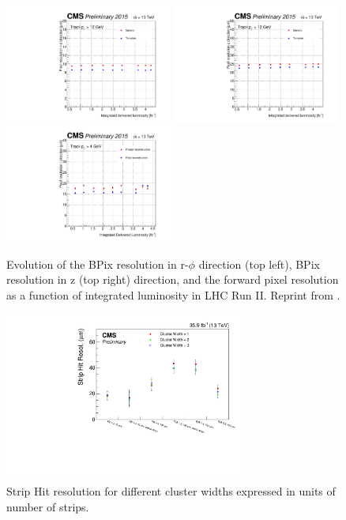\documentclass[thesis.tex]{subfiles}
\begin{document}
\begin{figure}[!htb]
	\centering
	\includegraphics[width=0.49\textwidth]{Fig/LumiPlot_x_GenericVsTemplate_ReReco_3.pdf}
	\includegraphics[width=0.49\textwidth]{Fig/LumiPlot_y_GenericVsTemplate_ReReco_3.pdf} \\
	\includegraphics[width=0.49\textwidth]{Fig/LuminosityHistoryPlot_all_template.pdf}
	\caption{Evolution of the BPix resolution in r-$\phi$ direction (top left), BPix resolution in z (top right) direction, and the forward pixel resolution as a function of integrated luminosity in LHC Run II. Reprint from \cite{PixelPerformance}.}
	\label{fig:pixelreso}
\end{figure}

\begin{figure}[!htb]
	\centering
	\includegraphics[width=0.7\textwidth]{Fig/StripHitRes.pdf}
	\caption{Strip Hit resolution for different cluster widths expressed in units of number of strips. }
	\label{fig:stripreso}
\end{figure}
\end{document}
